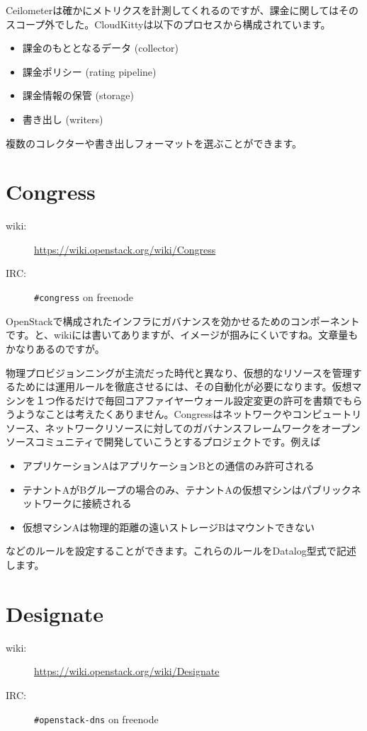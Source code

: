 Ceilometerは確かにメトリクスを計測してくれるのですが、課金に関してはそのスコープ外でした。CloudKittyは以下のプロセスから構成されています。

\begin{itemize}
	\item 課金のもととなるデータ (collector)
	\item 課金ポリシー (rating pipeline)
	\item 課金情報の保管 (storage)
	\item 書き出し (writers)
\end{itemize}

複数のコレクターや書き出しフォーマットを選ぶことができます。

\section{Congress}
\begin{description}
	\item[wiki:] \url{https://wiki.openstack.org/wiki/Congress}
	\item[IRC:] \verb|#congress| on freenode
\end{description}
OpenStackで構成されたインフラにガバナンスを効かせるためのコンポーネントです。と、wikiには書いてありますが、イメージが掴みにくいですね。文章量もかなりあるのですが。

物理プロビジョンニングが主流だった時代と異なり、仮想的なリソースを管理するためには運用ルールを徹底させるには、その自動化が必要になります。仮想マシンを１つ作るだけで毎回コアファイヤーウォール設定変更の許可を書類でもらうようなことは考えたくありません。Congressはネットワークやコンピュートリソース、ネットワークリソースに対してのガバナンスフレームワークをオープンソースコミュニティで開発していこうとするプロジェクトです。例えば

\begin{itemize}
	\item アプリケーションAはアプリケーションBとの通信のみ許可される
	\item テナントAがBグループの場合のみ、テナントAの仮想マシンはパブリックネットワークに接続される
	\item 仮想マシンAは物理的距離の遠いストレージBはマウントできない
\end{itemize}

などのルールを設定することができます。これらのルールをDatalog型式で記述します。

\section{Designate}
\begin{description}
	\item[wiki:] \url{https://wiki.openstack.org/wiki/Designate}
	\item[IRC:] \verb|#openstack-dns| on freenode
\end{description}

